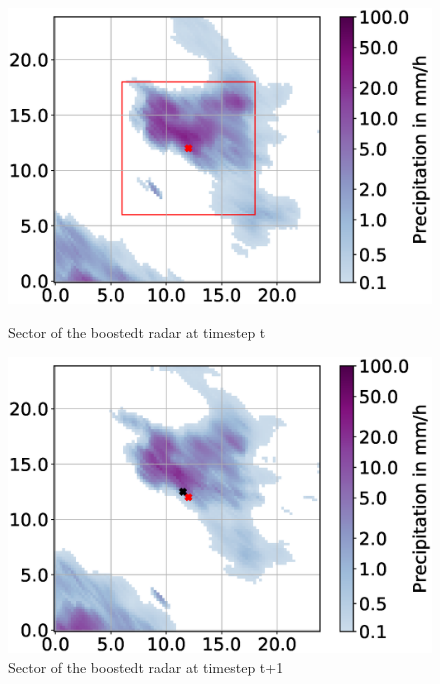 \documentclass[11pt,twoside,a4paper,fleqn,x11names]{report}
\numberwithin{equation}{chapter}
\numberwithin{figure}{chapter}
\numberwithin{table}{chapter}
\begin{document}
\begin{figure}[h]
	\centering
	\begin{minipage}{0.48\textwidth}
		\includegraphics[width=\textwidth,trim={32mm 0 5mm 0},clip]{displacement_t0.eps}
		\caption{Sector of the boostedt radar at timestep t}
		\label{fig:displacement_t0}
	\end{minipage}\hfill
	\begin{minipage}{0.48\textwidth}
		\includegraphics[width=\textwidth,trim={32mm 0 5mm 0},clip]{displacement_t1.eps}
		\caption{Sector of the boostedt radar at timestep t+1}
		\label{fig:displacement_t1}
	\end{minipage}

\end{figure}
\end{document}
